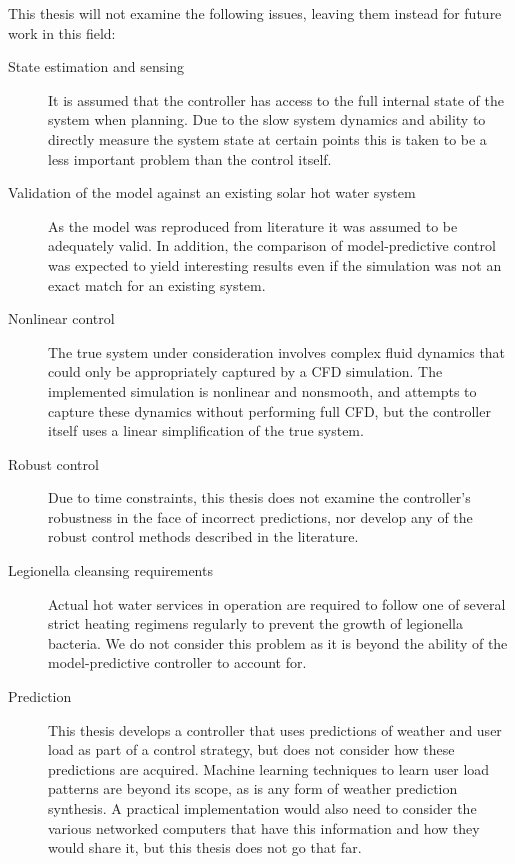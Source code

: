 This thesis will not examine the following issues, leaving them instead for future work in this field:

\begin{description}
	\item[State estimation and sensing]
         It is assumed that the controller has access to the full internal state of the system when planning.
         Due to the slow system dynamics and ability to directly measure the system state at certain points this is taken to be a less important problem than the control itself.

	\item[Validation of the model against an existing solar hot water system]
         As the model was reproduced from literature it was assumed to be adequately valid.
         In addition, the comparison of model-predictive control was expected to yield interesting results even if the simulation was not an exact match for an existing system.

	\item[Nonlinear control]
         The true system under consideration involves complex fluid dynamics that could only be appropriately captured by a CFD simulation.
         The implemented simulation is nonlinear and nonsmooth, and attempts to capture these dynamics without performing full CFD, but the controller itself uses a linear simplification of the true system.

	\item[Robust control]
         Due to time constraints, this thesis does not examine the controller's robustness in the face of incorrect predictions, nor develop any of the robust control methods described in the literature.

	\item[Legionella cleansing requirements]
			Actual hot water services in operation are required to follow one of several strict heating regimens regularly to prevent the growth of legionella bacteria.
			We do not consider this problem as it is beyond the ability of the model-predictive controller to account for.

   \item[Prediction]
         This thesis develops a controller that uses predictions of weather and user load as part of a control strategy, but does not consider how these predictions are acquired.
         Machine learning techniques to learn user load patterns are beyond its scope, as is any form of weather prediction synthesis.
         A practical implementation would also need to consider the various networked computers that have this information and how they would share it, but this thesis does not go that far.
\end{description}

